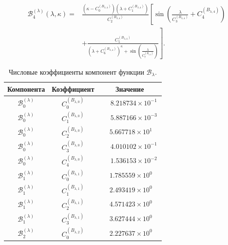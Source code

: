 \begin{equation}
	\begin{aligned}
		\mathcal B_4^{(\lambda)}(\lambda,\kappa)
		={}&
		\frac{
			\left(\kappa-C_0^{(B_{\lambda,4})}\right)
			\left(\lambda+C_1^{(B_{\lambda,4})}\right)
		}{C_2^{(B_{\lambda,4})}}
		\left[
		\sin\left(
		\frac{\lambda}{C_3^{(B_{\lambda,4})}}
		+C_4^{(B_{\lambda,4})}
		\right)
		\right.
		\\
		&\left.
		+
		\frac{
			C_5^{(B_{\lambda,4})}
		}{
			\left(\lambda+C_6^{(B_{\lambda,4})}\right)^\kappa
			+
			\sin\left(
			\frac{\lambda}{C_7^{(B_{\lambda,4})}}
			\right)
		}
		\right].
	\end{aligned}
	\label{eq:appendixC_B4_lam}
\end{equation}

\begin{table}[htbp]
	\centering
	\caption{Числовые коэффициенты компонент функции \(\mathcal B_\lambda\).}
	\label{tab:appendixC_B_lambda_coefficients}
	\small
	\begin{tabular}{|c|c|c|}
		\hline
		Компонента & Коэффициент & Значение \\
		\hline
		\(\mathcal B_0^{(\lambda)}\) & \(C_0^{(B_{\lambda,0})}\) & \(\phantom{-}8.218734\times10^{-1}\) \\
		\(\mathcal B_0^{(\lambda)}\) & \(C_1^{(B_{\lambda,0})}\) & \(\phantom{-}5.887166\times10^{-3}\) \\
		\(\mathcal B_0^{(\lambda)}\) & \(C_2^{(B_{\lambda,0})}\) & \(\phantom{-}5.667718\times10^{1\phantom{-}}\) \\
		\(\mathcal B_0^{(\lambda)}\) & \(C_3^{(B_{\lambda,0})}\) & \(\phantom{-}4.010102\times10^{-1}\) \\
		\(\mathcal B_0^{(\lambda)}\) & \(C_4^{(B_{\lambda,0})}\) & \(\phantom{-}1.536153\times10^{-2}\) \\
		\hline
		\(\mathcal B_1^{(\lambda)}\) & \(C_0^{(B_{\lambda,1})}\) & \(\phantom{-}1.785559\times10^{0\phantom{-}}\) \\
		\(\mathcal B_1^{(\lambda)}\) & \(C_1^{(B_{\lambda,1})}\) & \(\phantom{-}2.493419\times10^{0\phantom{-}}\) \\
		\(\mathcal B_1^{(\lambda)}\) & \(C_2^{(B_{\lambda,1})}\) & \(\phantom{-}4.571423\times10^{0\phantom{-}}\) \\
		\(\mathcal B_1^{(\lambda)}\) & \(C_3^{(B_{\lambda,1})}\) & \(\phantom{-}3.627444\times10^{0\phantom{-}}\) \\
		\hline
		\(\mathcal B_2^{(\lambda)}\) & \(C_0^{(B_{\lambda,2})}\) & \(\phantom{-}2.227637\times10^{0\phantom{-}}\) \\

\end{tabular}
\end{table}

